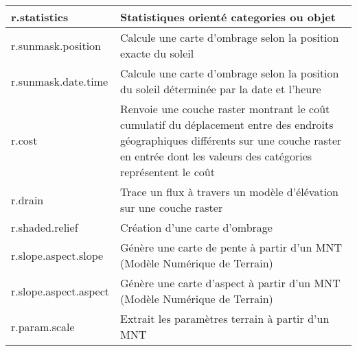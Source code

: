 \begin{center}
{\begin{longtable}{|p{2.5cm}|p{11.5cm}|}
  \hline r.statistics & Statistiques orienté categories ou objet\\
  \hline r.sunmask.position & Calcule une carte d'ombrage selon la position exacte du soleil \\  
  \hline r.sunmask.date.time & Calcule une carte d'ombrage selon la position du soleil déterminée par la date et l'heure \\  
  \hline r.cost & Renvoie une couche raster montrant le coût cumulatif du déplacement entre des endroits géographiques différents sur une couche raster en entrée dont les valeurs des catégories représentent le coût\\
  \hline r.drain & Trace un flux à travers un modèle d'élévation sur une couche raster\\
  \hline r.shaded.relief & Création d'une carte d'ombrage \\
  \hline r.slope.aspect.slope & Génère une carte de pente à partir d'un MNT (Modèle Numérique de Terrain) \\
  \hline r.slope.aspect.aspect & Génère une carte d'aspect à partir d'un MNT (Modèle Numérique de Terrain) \\
  \hline r.param.scale & Extrait les paramètres terrain à partir d'un MNT \\

\end{longtable}}
\end{center}
